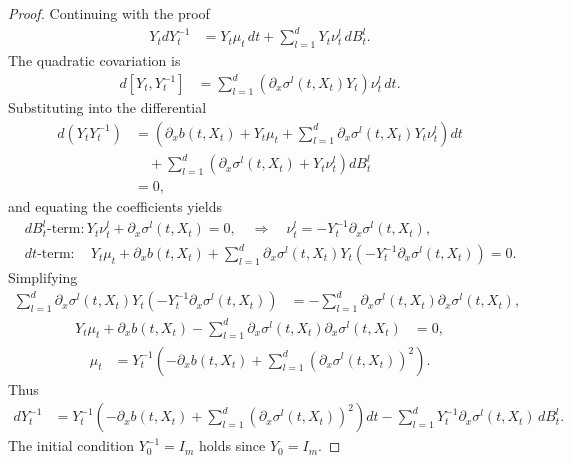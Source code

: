 \documentclass[]{interact}
\newcommand{\1}{\mathbf{1}}
\theoremstyle{plain}%
\theoremstyle{definition}
\theoremstyle{remark}
\numberwithin{equation}{section}
\begin{document}
\begin{proof}
%
Continuing with the proof
\begin{align*}
Y_t dY_t^{-1} &= Y_t \mu_t \, dt + \sum_{l=1}^d Y_t \nu_t^l \, dB_t^l.
\end{align*}
The quadratic covariation is
\begin{align*}
d[Y_t, Y_t^{-1}] &= \sum_{l=1}^d \left( \partial_x \sigma^l(t, X_t) Y_t \right) \nu_t^l \, dt.
\end{align*}
Substituting into the differential
\begin{align*}
d(Y_t Y_t^{-1}) &= \left( \partial_x b(t, X_t) + Y_t \mu_t + \sum_{l=1}^d \partial_x \sigma^l(t, X_t) Y_t \nu_t^l \right) dt \\
&\quad + \sum_{l=1}^d \left( \partial_x \sigma^l(t, X_t) + Y_t \nu_t^l \right) dB_t^l \\
&= 0,
\end{align*}
and equating the coefficients yields
\begin{align*}
&dB_t^l\text{-term}: Y_t \nu_t^l + \partial_x \sigma^l(t, X_t) = 0, \quad \Rightarrow\quad  \nu_t^l = - Y_t^{-1} \partial_x \sigma^l(t, X_t), \\
&dt\text{-term}: \quad Y_t \mu_t + \partial_x b(t, X_t) + \sum_{l=1}^d \partial_x \sigma^l(t, X_t) Y_t (- Y_t^{-1} \partial_x \sigma^l(t, X_t)) = 0.
\end{align*}
%
Simplifying 
\begin{align*}
\sum_{l=1}^d \partial_x \sigma^l(t, X_t) Y_t (- Y_t^{-1} \partial_x \sigma^l(t, X_t)) &= - \sum_{l=1}^d \partial_x \sigma^l(t, X_t) \partial_x \sigma^l(t, X_t),
\end{align*}
%
\begin{align*}
Y_t \mu_t + \partial_x b(t, X_t) - \sum_{l=1}^d \partial_x \sigma^l(t, X_t) \partial_x \sigma^l(t, X_t) &= 0,
\end{align*}
%
\begin{align*}
\mu_t &= Y_t^{-1} \left( - \partial_x b(t, X_t) + \sum_{l=1}^d \left( \partial_x \sigma^l(t, X_t) \right)^2 \right).
\end{align*}
%
Thus
\begin{align*}
dY_t^{-1} &= Y_t^{-1} \left( - \partial_x b(t, X_t) + \sum_{l=1}^d \left( \partial_x \sigma^l(t, X_t) \right)^2 \right) dt - \sum_{l=1}^d Y_t^{-1} \partial_x \sigma^l(t, X_t) \, dB_t^l.
\end{align*}
The initial condition \( Y_0^{-1} = I_m \) holds since \( Y_0 = I_m \).

\end{proof}
\end{document}
